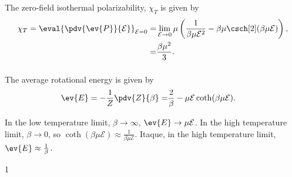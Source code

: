 \documentclass[a4paper,12pt,twoside]{article}
\newcommand{\mcols}{0}
\begin{document}
\begin{multicols*}{2}
\subsubsection{}
The zero-field isothermal polarizability, $\chi_T$ is given by
\begin{align}
	\chi_T = \eval{\pdv{\ev{P}}{\mathcal{E}}}_{\mathcal{E}=0}
	=& \lim_{\mathcal{E}\rightarrow 0} \mu \left( \frac{1}{\beta\mu\mathcal{E}^2} - \beta\mu\csch[2](\beta\mu\mathcal{E}) \right),\\
	=& \frac{\beta\mu^2}{3}.
\end{align}

\subsubsection{}
The average rotational energy is given by
\begin{align}
	\ev{E} = -\frac{1}{Z}\pdv{Z}{\beta} =& \frac{2}{\beta}-\mu\mathcal{E}\coth(\beta\mu\mathcal{E}).
\end{align}

In the low temperature limit, $\beta \rightarrow \infty$, $\ev{E} \rightarrow \mu\mathcal{E}$.
In the high temperature limit, $\beta \rightarrow 0$, so $\coth(\beta\mu\mathcal{E}) \approx \frac{1}{\beta\mu\mathcal{E}}$.
Itaque, in the high temperature limit, $\ev{E} \approx \frac{1}{\beta}$.



\printBib


\if\mcols1
\end{multicols*}
\fi
\end{document}
